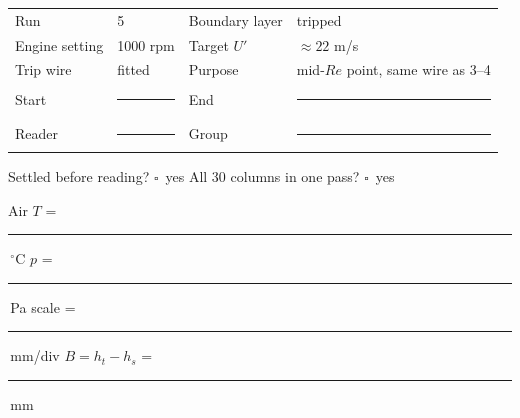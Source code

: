 \documentclass[10pt,a4paper]{article}
\newcommand{\blank}{\rule{1.55cm}{0.4pt}}
\newcommand{\checkbox}{\ensuremath{\square}}
\begin{document}
\begin{tabularx}{\textwidth}{@{}p{3.1cm}p{2.7cm}p{3.0cm}X@{}}
\toprule
Run & 5 & Boundary layer & tripped \\
Engine setting & 1000 rpm & Target $U'$ & $\approx22$ m/s \\
Trip wire & fitted & Purpose & mid-$Re$ point, same wire as 3--4 \\
Start & \blank & End & \blank \\
Reader & \blank & Group & \blank \\
\bottomrule
\end{tabularx}

{\small Settled before reading? \checkbox\ yes \qquad All 30 columns in one pass? \checkbox\ yes\par
Air $T$ = \blank\,$^\circ$C \qquad $p$ = \blank\,Pa \qquad
scale = \blank\,mm/div \qquad $B=h_t-h_s$ = \blank\,mm}
\end{document}
